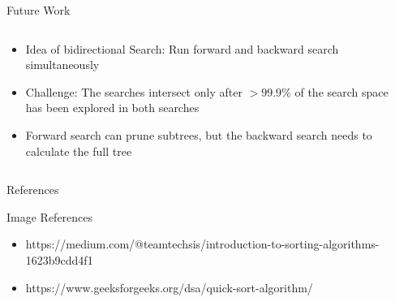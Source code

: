 \begin{frame}{Future Work}
  \vspace{-1.2cm}
  \begin{columns}
    \begin{column}{.49\textwidth}
      \begin{itemize}
        \item<+-> Idea of bidirectional Search: Run forward and backward search simultaneously
        \item<+-> Challenge: The searches intersect only after $> 99.9\%$ of the search space has been explored in both searches
        \item<+-> Forward search can prune subtrees, but the backward search needs to calculate the full tree
      \end{itemize}
    \end{column}
    \begin{column}{.49\textwidth}
    \end{column}
  \end{columns}
\end{frame}

\begin{frame}[shrink=25]{References}
  \nocite{*}
  \printbibliography[heading=none]
\end{frame}

\begin{frame}[shrink=25]{Image References}
  \begin{itemize}
    \item[] https://medium.com/@teamtechsis/introduction-to-sorting-algorithms-1623b9cdd4f1
    \item[] https://www.geeksforgeeks.org/dsa/quick-sort-algorithm/
  \end{itemize}
\end{frame}

\thanksframe